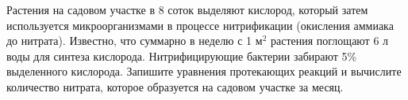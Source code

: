 
Растения на садовом участке в 8 соток выделяют кислород, который затем используется микроорганизмами в процессе 
нитрификации (окисления аммиака до нитрата). Известно, что суммарно в неделю с 1 м$^2$ растения поглощают 6 л воды 
для синтеза кислорода. Нитрифицирующие бактерии забирают 5\% выделенного кислорода. Запишите уравнения 
протекающих реакций и вычислите количество нитрата, которое образуется на садовом участке за месяц.